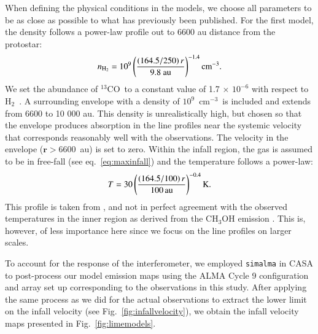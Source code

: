 \documentclass{aa}
\newcommand{\cmthree}{cm$^{-3}$}
\newcommand{\expo}[1]{$10^{#1}$}
\newcommand{\texpo}[1]{$\,\times\,10^{#1}$}
\newcommand{\htva}{H$_2$}
\newcommand{\trettenco}{$^{13}$CO\xspace}
\begin{document}
When defining the physical conditions in the models, we choose all parameters to be as close as possible to what has previously been published. For the first model, the density follows a power-law profile \citep{Kristensen:2012kx} out to 6600 au distance from the protostar:
\begin{equation}
    n_{\rm{H_2}} = 10^9 \left( \frac{(164.5/250)\, r}{9.8~\rm{au}} \right)^{-1.4} \rm{cm}^{-3}.
    \label{eq:densityspherical}
\end{equation}
We set the abundance of \trettenco\ to a constant value of 1.7\texpo{-6} with respect to \htva\ \citep{Frerking:1987mu}. A surrounding envelope with a density of \expo{9}~\cmthree\ is included and extends from 6600 to 10 000 au. This density is unrealistically high, but chosen so that the envelope produces absorption in the line profiles near the systemic velocity that corresponds reasonably well with the observations. The velocity in the envelope ($\mathbf{r}>$6600~au) is set to zero. Within the infall region, the gas is assumed to be in free-fall (see eq.~\ref{eq:maxinfall}) and the temperature follows a power-law:
\begin{equation}
    T = 30 \left( \frac{(164.5/100)\,r}{100\,\rm{au}}  \right)^{-0.4} \rm{K}.
    \label{eq:temperature}
\end{equation}
This profile is taken from \citet{Yen:2015vf}, and not in perfect agreement with the observed temperatures in the inner region as derived from the CH$_3$OH emission \citep{Bjerkeli:2019ip}. This is, however, of less importance here since we focus on the line profiles on larger scales.

To account for the response of the interferometer, we employed \texttt{simalma} in CASA to post-process our model emission maps using the ALMA Cycle 9 configuration and array set up corresponding to the observations in this study. After applying the same process as we did for the actual observations to extract the lower limit on the infall velocity (see Fig.~\ref{fig:infallvelocity}), we obtain the infall velocity maps presented in Fig.\ \ref{fig:limemodels}.
\end{document}
